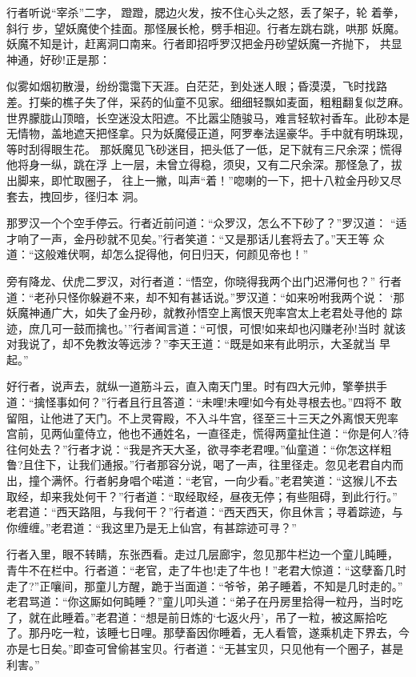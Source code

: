 行者听说“宰杀”二字，蹬蹬，腮边火发，按不住心头之怒，丢了架子，轮
着拳，斜行步，望妖魔使个挂面。那怪展长枪，劈手相迎。行者左跳右跳，哄那
妖魔。妖魔不知是计，赶离洞口南来。行者即招呼罗汉把金丹砂望妖魔一齐抛下，
共显神通，好砂!正是那：

似雾如烟初散漫，纷纷霭霭下天涯。白茫茫，到处迷人眼；昏漠漠，飞时找路
差。打柴的樵子失了伴，采药的仙童不见家。细细轻飘如麦面，粗粗翻复似芝麻。
世界朦胧山顶暗，长空迷没太阳遮。不比嚣尘随骏马，难言轻软衬香车。此砂本是
无情物，盖地遮天把怪拿。只为妖魔侵正道，阿罗奉法逞豪华。手中就有明珠现，
等时刮得眼生花。
那妖魔见飞砂迷目，把头低了一低，足下就有三尺余深；慌得他将身一纵，跳在浮
上一层，未曾立得稳，须臾，又有二尺余深。那怪急了，拔出脚来，即忙取圈子，
往上一撇，叫声“着！”唿喇的一下，把十八粒金丹砂又尽套去，拽回步，径归本
洞。

那罗汉一个个空手停云。行者近前问道：“众罗汉，怎么不下砂了？”罗汉道：
“适才响了一声，金丹砂就不见矣。”行者笑道：“又是那话儿套将去了。”天王等
众道：“这般难伏啊，却怎么捉得他，何日归天，何颜见帝也！”

旁有降龙、伏虎二罗汉，对行者道：“悟空，你晓得我两个出门迟滞何也？”
行者道：“老孙只怪你躲避不来，却不知有甚话说。”罗汉道：“如来吩咐我两个说：
‘那妖魔神通广大，如失了金丹砂，就教孙悟空上离恨天兜率宫太上老君处寻他的
踪迹，庶几可一鼓而擒也。’”行者闻言道：“可恨，可恨!如来却也闪赚老孙!当时
就该对我说了，却不免教汝等远涉？”李天王道：“既是如来有此明示，大圣就当
早起。”

好行者，说声去，就纵一道筋斗云，直入南天门里。时有四大元帅，擎拳拱手
道：“擒怪事如何？”行者且行且答道：“未哩!未哩!如今有处寻根去也。”四将不
敢留阻，让他进了天门。不上灵霄殿，不入斗牛宫，径至三十三天之外离恨天兜率
宫前，见两仙童侍立，他也不通姓名，一直径走，慌得两童扯住道：“你是何人?待
往何处去？”行者才说：“我是齐天大圣，欲寻李老君哩。”仙童道：“你怎这样粗
鲁?且住下，让我们通报。”行者那容分说，喝了一声，往里径走。忽见老君自内而
出，撞个满怀。行者躬身唱个喏道：“老官，一向少看。”老君笑道：“这猴儿不去
取经，却来我处何干？”行者道：“取经取经，昼夜无停；有些阻碍，到此行行。”
老君道：“西天路阻，与我何干？”行者道：“西天西天，你且休言；寻着踪迹，与
你缠缠。”老君道：“我这里乃是无上仙宫，有甚踪迹可寻？”

行者入里，眼不转睛，东张西看。走过几层廊宇，忽见那牛栏边一个童儿盹睡，
青牛不在栏中。行者道：“老官，走了牛也!走了牛也！”老君大惊道：“这孽畜几时
走了?”正嚷间，那童儿方醒，跪于当面道：“爷爷，弟子睡着，不知是几时走的。”
老君骂道：“你这厮如何盹睡？”童儿叩头道：“弟子在丹房里拾得一粒丹，当时吃
了，就在此睡着。”老君道：“想是前日炼的‘七返火丹’，吊了一粒，被这厮拾吃
了。那丹吃一粒，该睡七日哩。那孽畜因你睡着，无人看管，遂乘机走下界去，今
亦是七日矣。”即查可曾偷甚宝贝。行者道：“无甚宝贝，只见他有一个圈子，甚是
利害。”

